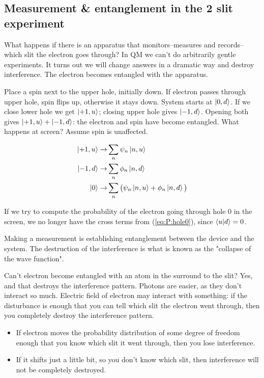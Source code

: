 \documentclass[]{article}
\begin{document}
\subsection{Measurement \& entanglement in the 2 slit experiment}

What happens if there is an apparatus that monitors--measures and records--which slit the electron goes through? In QM we can't do arbitrarily gentle experiments. It turns out we will change answers in a dramatic way and destroy interference. The electron becomes entangled with the apparatus.

Place a spin next to the upper hole, initially down. If electron passes through upper hole, spin flips up, otherwise it stays down. System starts at $\ket{0,d}$. If we close lower hole we get $\ket{+1,u}$; closing upper hole gives $\ket{-1,d}$. Opening both gives $\ket{+1,u}+\ket{-1,d}$: the electron and spin have become entangled. What happens at screen? Assume spin is unaffected.

\begin{align*}
	\ket{+1,u} \rightarrow& \sum_n \psi_n \ket{n,u}  \\
	\ket{-1,d} \rightarrow& \sum_n \phi_n \ket{n,d} \\
	\ket{0} \rightarrow& \sum_n \big(\psi_n \ket{n,u} + \phi_n \ket{n,d}\big)
\end{align*}

If we try to compute the probability of the electron going through hole 0 in the screen, we no longer have the cross terms from (\ref{eq:P:hole0}), since $\braket{u\vert d}=0$.

Making a measurement is establishing entanglement between the device and the system. The destruction of the interference is what is known as the "collapse of the wave function".

Can't electron become entangled with an atom in the surround to the slit? Yes, and that destroys the interference pattern. Photons are easier, as they don't interact so much. Electric field of electron may interact with something: if the disturbance is enough that you can tell which slit the electron went through, then you completely destroy the interference pattern. \begin{itemize}
	\item If electron moves the probability distribution of some degree of freedom enough that you know which slit it went through, then you lose interference.
	\item If it shifts just a little bit, so you don't know which slit, then interference will not be completely destroyed.
\end{itemize}
\end{document}
